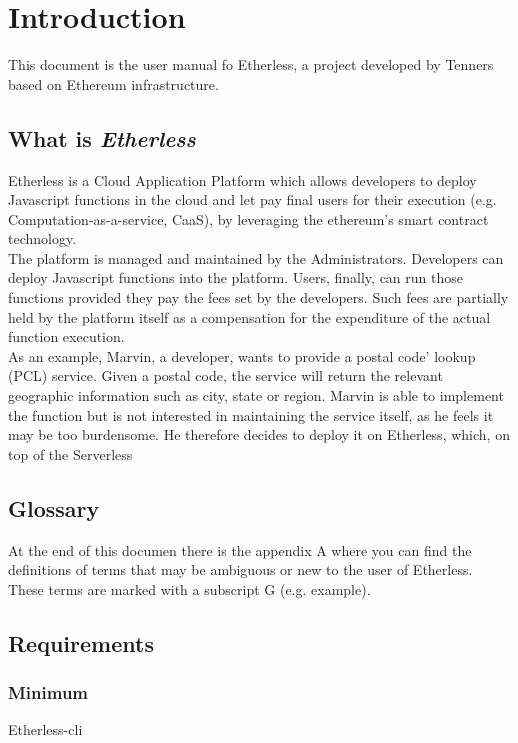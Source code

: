 \section{Introduction}
This document is the user manual fo Etherless, a project developed by Tenners based on Ethereum infrastructure.

\subsection{What is \textit{Etherless}}
Etherless is a Cloud Application Platform which allows developers to deploy Javascript functions in the cloud and let pay final users for their execution (e.g. Computation-as-a-service, CaaS), by leveraging the ethereum's smart contract technology.\\
The platform is managed and maintained by the Administrators. 
Developers can deploy Javascript functions into the platform. Users, finally, can run those functions provided they pay the fees set by the developers. Such fees are partially held by the platform itself as a compensation for the expenditure of the actual function execution.\\
As an example, Marvin, a developer, wants to provide a postal code' lookup (PCL) service. Given a postal 
code, the service will return the relevant geographic information such as city, state or region. Marvin is able 
to implement the function but is not interested in maintaining the service itself, as he feels it may be too 
burdensome. He therefore decides to deploy it on Etherless, which, on top of the Serverless

\subsection{Glossary}
At the end of this documen there is the appendix A where you can find the definitions of terms that may be ambiguous or new to the user of Etherless. These terms are marked with a subscript G (e.g. example\glos).

\subsection{Requirements}
\subsubsection{Minimum}
Etherless-cli